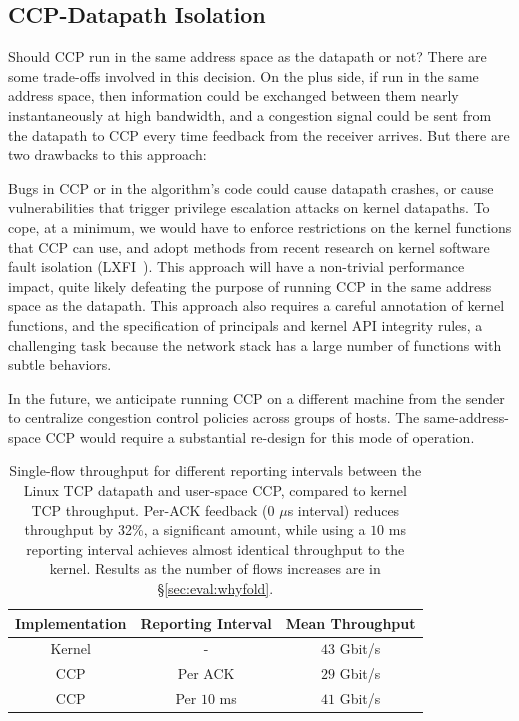 \subsection{CCP-Datapath Isolation}

Should CCP run in the same address space as the datapath or not? There are some trade-offs involved in this decision. On the plus side, if run in the same address space, then information could be exchanged between them nearly instantaneously at high bandwidth, and a congestion signal could be sent from the datapath to CCP every time feedback from the receiver arrives. But there are two drawbacks to this approach:

 Bugs in CCP or in the algorithm's code could cause datapath crashes, or cause vulnerabilities that trigger privilege escalation attacks on kernel datapaths. 
To cope, at a minimum, we would have to enforce restrictions on the kernel functions that CCP can use, and adopt methods from recent research on kernel software fault isolation (LXFI~\cite{lxfi}). 
This approach will have a non-trivial performance impact, quite likely defeating the purpose of running CCP in the same address space as the datapath. 
This approach also requires a careful annotation of kernel functions, and the specification of principals and kernel API integrity rules, a challenging task because the network stack has a large number of functions with subtle behaviors.
    
 In the future, we anticipate running CCP on a different machine from the sender to centralize congestion control policies across groups of hosts. 
The same-address-space CCP would require a substantial re-design for this mode of operation.

\begin{table}[]
    \centering
    \begin{tabular}{c|c|c}
        Implementation & Reporting Interval & Mean Throughput \\
        \hline
        Kernel & - & $43$ Gbit/s \\
        CCP & Per ACK & $29$ Gbit/s \\
        CCP & Per $10$ ms & $41$ Gbit/s \\
    \end{tabular}
    \caption{Single-flow throughput for different reporting intervals between the Linux TCP datapath and user-space CCP, compared to kernel TCP throughput. Per-ACK feedback (0 $\mu$s interval) reduces throughput by 32\%, a significant amount, while using a $10$ ms reporting interval achieves almost identical throughput to the kernel. Results as the number of flows  increases are in \S\ref{sec:eval:whyfold}.}\label{fig:perf:interval}
\end{table}

